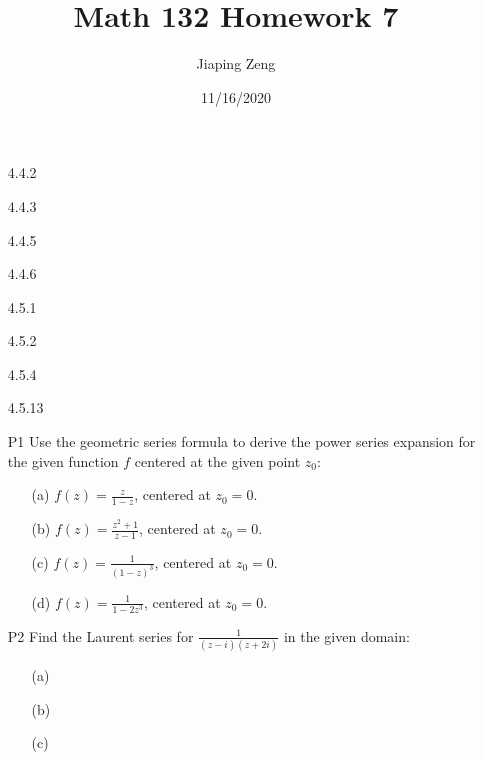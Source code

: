 \documentclass{article}
\title{Math 132 Homework 7}
\date{11/16/2020}
\author{Jiaping Zeng}
\begin{document}
\maketitle

\begin{itemize}
    \item [4.4.2]
    \item [4.4.3]
    \item [4.4.5]
    \item [4.4.6]
    \item [4.5.1]
    \item [4.5.2]
    \item [4.5.4]
    \item [4.5.13]
    \item [P1] Use the geometric series formula to derive the power series expansion for the given function $f$ centered at the given point $z_0$:
          \begin{itemize}
              \item [(a)] $f(z)=\frac{z}{1-z}$, centered at $z_0=0$.
              \item [(b)] $f(z)=\frac{z^2+1}{z-1}$, centered at $z_0=0$.
              \item [(c)] $f(z)=\frac{1}{(1-z)^3}$, centered at $z_0=0$.
              \item [(d)] $f(z)=\frac{1}{1-2z^3}$, centered at $z_0=0$.
          \end{itemize}
    \item [P2] Find the Laurent series for $\frac{1}{(z-i)(z+2i)}$ in the given domain:
    \begin{itemize}
        \item [(a)]
        \item [(b)]
        \item [(c)]
    \end{itemize}
\end{itemize}
\end{document}
